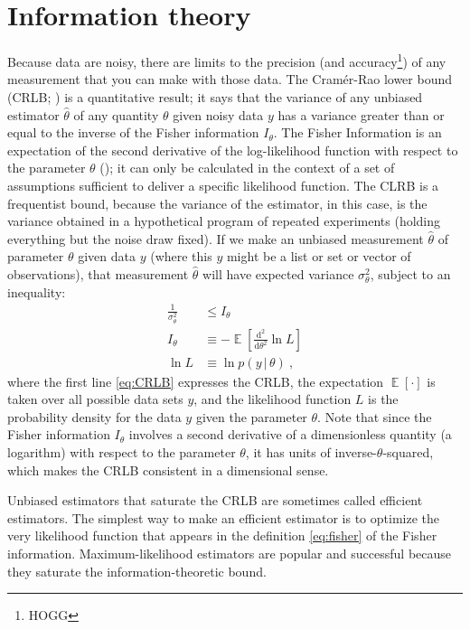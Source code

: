 \documentclass[modern]{aastex631}
\DeclareMathOperator{\E}{\mathbb{E}}
\newcommand{\dd}{\mathrm{d}}
\newcommand{\given}{\,|\,}
\begin{document}
\section{Information theory}\label{sec:info}

Because data are noisy, there are limits to the precision (and accuracy\footnote{HOGG}) of any measurement that you can make with those data.
The Cram\'er-Rao lower bound (CRLB; \citealt{crlb}) is a quantitative result; it says that the variance of any unbiased estimator $\widehat{\theta}$ of any quantity $\theta$ given noisy data $y$ has a variance greater than or equal to the inverse of the Fisher information $I_\theta$.
The Fisher Information is an expectation of the second derivative of the log-likelihood function with respect to the parameter $\theta$ (\citealt{fisher}); it can only be calculated in the context of a set of assumptions sufficient to deliver a specific likelihood function.
The CLRB is a frequentist bound, because the variance of the estimator, in this case, is the variance obtained in a hypothetical program of repeated experiments (holding everything but the noise draw fixed).
If we make an unbiased measurement $\widehat{\theta}$ of parameter $\theta$ given data $y$ (where this $y$ might be a list or set or vector of observations), that measurement $\widehat{\theta}$ will have expected variance $\sigma_\theta^2$, subject to an inequality:
\begin{align}
    \frac{1}{\sigma_\theta^2} &\leq I_\theta\label{eq:CRLB}\\
    I_\theta &\equiv -\E\left[\frac{\dd^2}{\dd\theta^2}\ln L\right]\label{eq:fisher}\\
    \ln L &\equiv \ln p(y\given\theta)~,
\end{align}
where the first line \eqref{eq:CRLB} expresses the CRLB,
the expectation $\E[\cdot]$ is taken over all possible data sets $y$,
and the likelihood function $L$ is the probability density for the data $y$ given the parameter $\theta$.
Note that since the Fisher information $I_\theta$ involves a second derivative of a dimensionless quantity (a logarithm) with respect to the parameter $\theta$, it has units of inverse-$\theta$-squared, which makes the CRLB consistent in a dimensional sense.

Unbiased estimators that saturate the CRLB are sometimes called efficient estimators.
The simplest way to make an efficient estimator is to optimize the very likelihood function that appears in the definition \eqref{eq:fisher} of the Fisher information.
Maximum-likelihood estimators are popular and successful because they saturate the information-theoretic bound.
\end{document}
